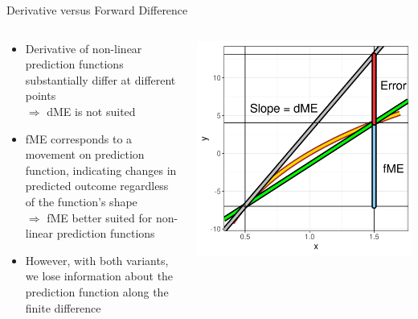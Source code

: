 \documentclass[11pt,compress,t,notes=noshow, aspectratio=169, xcolor=table]{beamer}
\begin{document}

\begin{frame}{Derivative versus Forward Difference}


\begin{columns}[T]
\begin{column}{0.6\textwidth}
\begin{itemize}
\itemsep1em
\item Derivative of non-linear prediction functions substantially differ at different points \\
$\Rightarrow$ dME is not suited
\item fME corresponds to a movement on prediction function, indicating changes in predicted outcome regardless of the function's shape\\
$\Rightarrow$ fME better suited for non-linear prediction functions
\item However, with both variants, we lose information about the prediction function along the finite difference
\end{itemize}
\end{column}
\begin{column}{0.4\textwidth}
 \includegraphics[width = \textwidth]{figure_man/derivative_me_error.png}
\end{column}
\end{columns}

\end{frame}
\end{document}
